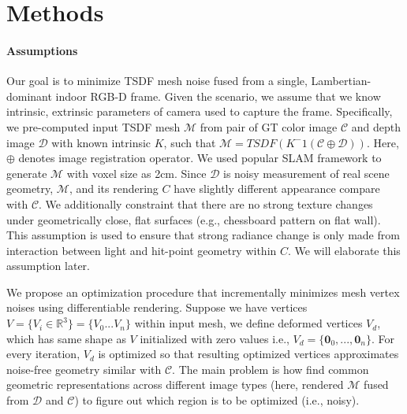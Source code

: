 \section{Methods}

\paragraph{Assumptions}
Our goal is to minimize TSDF mesh noise fused from 
a single, Lambertian-dominant indoor RGB-D frame. 
Given the scenario, we assume that we know intrinsic, extrinsic parameters of camera used to capture the frame. 
Specifically, we pre-computed input TSDF mesh $\mathcal{M}$ from 
pair of GT color image $\mathcal{C}$ and depth image $\mathcal{D}$ with known intrinsic $K$, such that $\mathcal{M}=TSDF(K^-1(\mathcal{C}\oplus\mathcal{D}))$.
Here, $\oplus$  denotes image registration operator. 
We used popular SLAM framework \cite{zhou2018open3d} to generate $\mathcal{M}$ with voxel size as 2cm. 
Since $\mathcal{D}$ is noisy measurement of real scene geometry, 
$\mathcal{M}$, and its rendering $C$ have slightly different appearance compare with $\mathcal{C}$. 
We additionally constraint that there are no strong texture changes 
under geometrically close, flat surfaces (e.g., chessboard pattern on flat wall). 
This assumption is used to ensure that strong radiance change is 
only made from interaction between light and hit-point geometry within $C$. 
We will elaborate this assumption later.

We propose an optimization procedure that incrementally minimizes mesh vertex noises using differentiable rendering. 
Suppose we have vertices $V=\{V_i\in\mathbb{R}^3\}=\{V_0...V_n\}$ within input mesh, we define deformed vertices $V_d$, which has same shape as $V$ initialized with zero values i.e., $V_d=\{\mathbf{0}_0,...,\mathbf{0}_n\}$. 
For every iteration, $V_d$ is optimized so that resulting optimized vertices approximates noise-free geometry similar with $\mathcal{C}$.  
The main problem is how find common geometric representations across different image types (here, rendered $\mathcal{M}$ fused from $\mathcal{D}$ and $\mathcal{C}$) 
to figure out which region is to be optimized (i.e., noisy).

